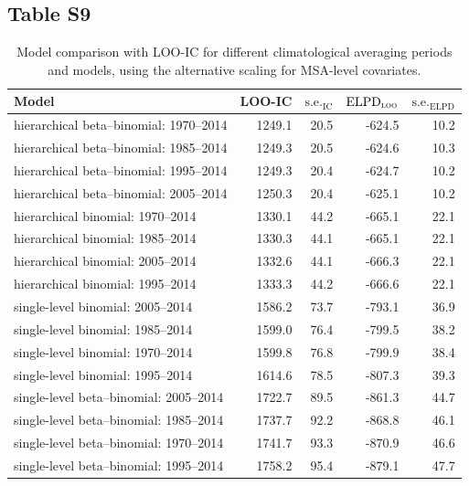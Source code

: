 \documentclass[draft]{agujournal}\usepackage{knitr}
\begin{document}
\subsection*{Table S9}
\begin{table}[H]
\centering
\begingroup\small
\begin{tabular}{p{3in}rrrr}
  \hline
Model & LOO-IC & $\text{s.e.}_{\text{IC}}$ & $\text{ELPD}_{\text{\scshape{loo}}}$ & $\text{s.e.}_{\text{ELPD}}$ \\ 
  \hline
hierarchical beta--binomial: 1970--2014 & 1249.1 & 20.5 & -624.5 & 10.2 \\ 
  hierarchical beta--binomial: 1985--2014 & 1249.3 & 20.5 & -624.6 & 10.3 \\ 
  hierarchical beta--binomial: 1995--2014 & 1249.3 & 20.4 & -624.7 & 10.2 \\ 
  hierarchical beta--binomial: 2005--2014 & 1250.3 & 20.4 & -625.1 & 10.2 \\ 
  hierarchical binomial: 1970--2014 & 1330.1 & 44.2 & -665.1 & 22.1 \\ 
  hierarchical binomial: 1985--2014 & 1330.3 & 44.1 & -665.1 & 22.1 \\ 
  hierarchical binomial: 2005--2014 & 1332.6 & 44.1 & -666.3 & 22.1 \\ 
  hierarchical binomial: 1995--2014 & 1333.3 & 44.2 & -666.6 & 22.1 \\ 
  single-level binomial: 2005--2014 & 1586.2 & 73.7 & -793.1 & 36.9 \\ 
  single-level binomial: 1985--2014 & 1599.0 & 76.4 & -799.5 & 38.2 \\ 
  single-level binomial: 1970--2014 & 1599.8 & 76.8 & -799.9 & 38.4 \\ 
  single-level binomial: 1995--2014 & 1614.6 & 78.5 & -807.3 & 39.3 \\ 
  single-level beta--binomial: 2005--2014 & 1722.7 & 89.5 & -861.3 & 44.7 \\ 
  single-level beta--binomial: 1985--2014 & 1737.7 & 92.2 & -868.8 & 46.1 \\ 
  single-level beta--binomial: 1970--2014 & 1741.7 & 93.3 & -870.9 & 46.6 \\ 
  single-level beta--binomial: 1995--2014 & 1758.2 & 95.4 & -879.1 & 47.7 \\ 
   \hline
\end{tabular}
\endgroup
\caption[Model comparison: LOO (climatological interval using alternative scaling).]{Model comparison with LOO-IC for different climatological averaging periods and models, using the alternative scaling for MSA-level covariates.} 
\label{tab:loo.years}
\end{table}
\end{document}
